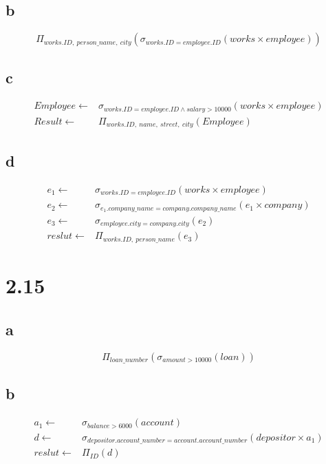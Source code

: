 \documentclass{article}
\begin{document}
    \subsection*{b} $$\Pi_{works.ID,\  person\_name, \ city}(\sigma_{works.ID=employee.ID}(works \times employee))$$
    \subsection*{c} 
    \begin{equation*}
        \begin{split}
            Employee\leftarrow &\sigma_{works.ID=employee.ID\wedge salary>10000 }(works \times employee)\\
            Result\leftarrow & \Pi_{works.ID,\ name,\ street,\ city}(Employee)
        \end{split}
    \end{equation*}
    \subsection*{d}
    \begin{equation*}
        \begin{split}
            e_1\leftarrow & \sigma_{works.ID=employee.ID}(works\times employee)\\
            e_2\leftarrow & \sigma_{e_1.company\_name=company.company\_name}(e_1\times company)\\
            e_3\leftarrow & \sigma_{employee.city=company.city}(e_2)\\
            reslut\leftarrow & \Pi_{works.ID,\ person\_name}(e_3)
        \end{split}
    \end{equation*}
    \section*{2.15}
    \subsection*{a} $$\Pi_{loan\_number}(\sigma_{amount>10000}(loan ))$$
    \subsection*{b} 
    \begin{equation*}
        \begin{split}
            a_1\leftarrow & \sigma_{balance>6000}(account)\\
            d\leftarrow & \sigma_{depositor.account\_number=account.account\_number}(depositor\times a_1)\\
            reslut\leftarrow & \Pi_{ID}(d)
        \end{split}
    \end{equation*}
\end{document}

